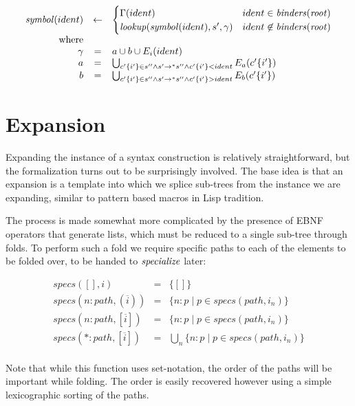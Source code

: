 \documentclass{kththesis}
\begin{document}
$$
\begin{array}{rcl}
\mathit{symbol}(ident) & <- &
\begin{cases}
\Gamma(ident) & ident \in \mathit{binders}(\mathit{root}) \\
\mathit{lookup}(\mathit{symbol}(ident), s', \gamma) & ident \not\in \mathit{binders}(\mathit{root}) \\
\end{cases} \\
\text{where} & & \\
\gamma & = & a \cup b \cup E_i(ident) \\
a & = & \bigcup_{c'\{i'\} \in s'' \land s' ->* s'' \land c'\{i'\} < ident} E_a(c'\{i'\}) \\
b & = & \bigcup_{c'\{i'\} \in s'' \land s' ->* s'' \land c'\{i'\} > ident} E_b(c'\{i'\}) \\
\end{array}
$$

\section{Expansion} \label{sec:expansion-formalization}

Expanding the instance of a syntax construction is relatively straightforward, but the formalization turns out to be surprisingly involved. The base idea is that an expansion is a template into which we splice sub-trees from the instance we are expanding, similar to pattern based macros in Lisp tradition.

The process is made somewhat more complicated by the presence of EBNF operators that generate lists, which must be reduced to a single sub-tree through folds. To perform such a fold we require specific paths to each of the elements to be folded over, to be handed to $\mathit{specialize}$ later:

\newcommand{\specs}{\ensuremath{\mathit{specs}}}

$$
\begin{array}{rcl}
\specs([], i) & = & \{[]\} \\
\specs(n:path, (\overline{i})) & = & \{n : p \mid p \in \specs(path, i_n)\} \\
\specs(n:path, [\overline{i}]) & = & \{n : p \mid p \in \specs(path, i_n)\} \\
\specs(*:path, [\overline{i}]) & = & \bigcup\limits_{n} \{n:p \mid p \in \specs(path, i_n)\} \\
\end{array}
$$

Note that while this function uses set-notation, the order of the paths will be important while folding. The order is easily recovered however using a simple lexicographic sorting of the paths.
\end{document}
